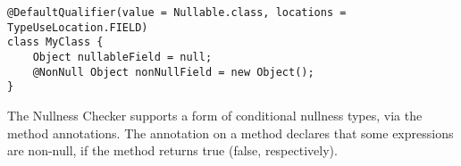 \begin{Verbatim}
@DefaultQualifier(value = Nullable.class, locations = TypeUseLocation.FIELD)
class MyClass {
    Object nullableField = null;
    @NonNull Object nonNullField = new Object();
}
\end{Verbatim}


%



The Nullness Checker supports a form of conditional nullness types, via the
 method annotations.
The annotation on a method declares that some expressions are non-null, if
the method returns true (false, respectively).

